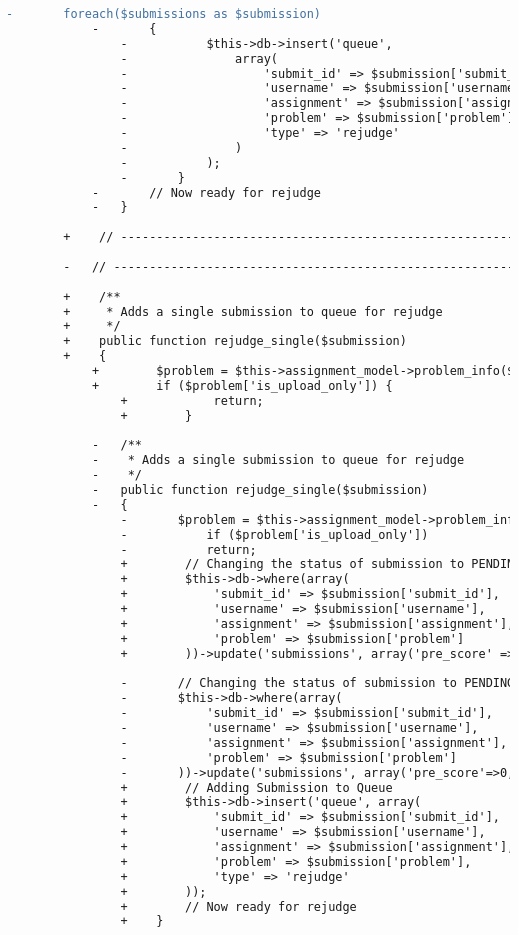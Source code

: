 \begin{lstlisting}[language=diff, caption=Perubahan pada kode Queue\_model.php]
			-		foreach($submissions as $submission)
			-		{
				-			$this->db->insert('queue',
				-				array(
				-					'submit_id' => $submission['submit_id'],
				-					'username' => $submission['username'],
				-					'assignment' => $submission['assignment'],
				-					'problem' => $submission['problem'],
				-					'type' => 'rejudge'
				-				)
				-			);
				-		}
			-		// Now ready for rejudge
			-	}
		
		+    // ------------------------------------------------------------------------
		
		-	// ------------------------------------------------------------------------
		
		+    /**
		+     * Adds a single submission to queue for rejudge
		+     */
		+    public function rejudge_single($submission)
		+    {
			+        $problem = $this->assignment_model->problem_info($submission['assignment'], $submission['problem']);
			+        if ($problem['is_upload_only']) {
				+            return;
				+        }
			
			-	/**
			-	 * Adds a single submission to queue for rejudge
			-	 */
			-	public function rejudge_single($submission)
			-	{
				-		$problem = $this->assignment_model->problem_info($submission['assignment'], $submission['problem']);
				-			if ($problem['is_upload_only'])
				-			return;
				+        // Changing the status of submission to PENDING
				+        $this->db->where(array(
				+            'submit_id' => $submission['submit_id'],
				+            'username' => $submission['username'],
				+            'assignment' => $submission['assignment'],
				+            'problem' => $submission['problem']
				+        ))->update('submissions', array('pre_score' => 0, 'status' => 'PENDING'));
				
				-		// Changing the status of submission to PENDING
				-		$this->db->where(array(
				-			'submit_id' => $submission['submit_id'],
				-			'username' => $submission['username'],
				-			'assignment' => $submission['assignment'],
				-			'problem' => $submission['problem']
				-		))->update('submissions', array('pre_score'=>0, 'status'=>'PENDING'));
				+        // Adding Submission to Queue
				+        $this->db->insert('queue', array(
				+            'submit_id' => $submission['submit_id'],
				+            'username' => $submission['username'],
				+            'assignment' => $submission['assignment'],
				+            'problem' => $submission['problem'],
				+            'type' => 'rejudge'
				+        ));
				+        // Now ready for rejudge
				+    }
			

\end{lstlisting}
